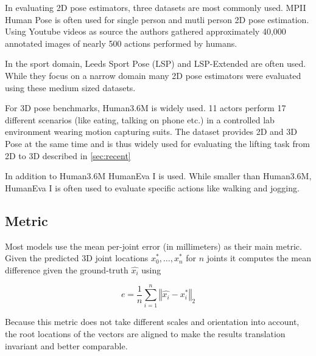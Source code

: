 \documentclass[twoside]{article}
\begin{document}
\begin{multicols}{2}
In evaluating 2D pose estimators, three datasets are most commonly used.
MPII Human Pose \cite{andriluka_2d_2014} is often used for single person and mutli person 2D pose estimation.
Using Youtube videos as source the authors gathered approximately 40,000 annotated images of nearly 500 actions performed by humans. 

In the sport domain, Leeds Sport Pose (LSP) \cite{johnson_clustered_2010} and LSP-Extended \cite{johnson_learning_2011} are often used.
While they focus on a narrow domain many 2D pose estimators were evaluated using these medium sized datasets.

For 3D pose benchmarks, Human3.6M \cite{ionescu_human3.6m:_2014} is widely used.
11 actors perform 17 different scenarios (like eating, talking on phone etc.) in a controlled lab environment wearing motion capturing suits.
The dataset provides 2D and 3D Pose at the same time and is thus widely used for evaluating the lifting task from 2D to 3D described in \ref{sec:recent}

In addition to Human3.6M HumanEva I \cite{sigal_humaneva:_2010} is used.
While smaller than Human3.6M, HumanEva I is often used to evaluate specific actions like walking and jogging.


\subsection{Metric}

Most models use the mean per-joint error (in millimeters) as their main metric.
Given the predicted 3D joint locations $x_0^{*}, \dots, x_n^{*}$ for $n$ joints it computes the mean difference given the ground-truth $\hat{x_i}$ using

\newcommand\norm[1]{\left\Vert#1\right\Vert}

\[
    e = \frac{1}{n} \sum_{i=1}^{n} \norm{\hat{x_i} - x_i^{*}}_2
\]

Because this metric does not take different scales and orientation into account, the root locations of the vectors are aligned to make the results translation invariant and better comparable.






\end{multicols}
\end{document}
